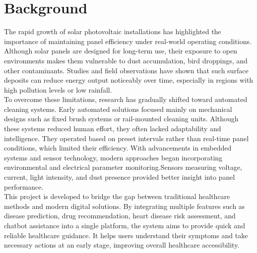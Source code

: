 \documentclass[10pt]{report}
\begin{document}
\begin{sloppypar}
{{{\begin{sloppypar}
\linespread{1.5}
\section{Background}
\hspace{0.5cm}
The rapid growth of solar photovoltaic installations has highlighted the importance of maintaining panel efficiency under real-world operating conditions. Although solar panels are designed for long-term use, their exposure to open environments makes them vulnerable to dust accumulation, bird droppings, and other contaminants. Studies and field observations have shown that such surface deposits can reduce energy output noticeably over time, especially in regions with high pollution levels or low rainfall.\\

To overcome these limitations, research has gradually shifted toward automated cleaning systems. Early automated solutions focused mainly on mechanical designs such as fixed brush systems or rail-mounted cleaning units. Although these systems reduced human effort, they often lacked adaptability and intelligence. They operated based on preset intervals rather than real-time panel conditions, which limited their
efficiency. With advancements in embedded systems and sensor technology, modern approaches began incorporating environmental and electrical parameter monitoring.Sensors measuring voltage, current, light intensity, and dust presence provided better insight into panel performance.
\\

This project is developed to bridge the gap between traditional healthcare methods and modern digital solutions. By integrating multiple features such as disease prediction, drug recommendation, heart disease risk assessment, and chatbot assistance into a single platform, the system aims to provide quick and reliable healthcare guidance. It helps users understand their symptoms and take necessary actions at an early stage, improving overall healthcare accessibility.

\end{sloppypar}}}}
\end{sloppypar}
\end{document}
